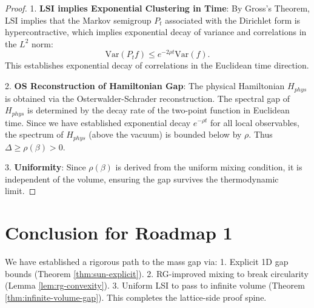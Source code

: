 \begin{proof}
1. \textbf{LSI implies Exponential Clustering in Time}: By Gross's Theorem, LSI implies that the Markov semigroup $P_t$ associated with the Dirichlet form is hypercontractive, which implies exponential decay of variance and correlations in the $L^2$ norm:
\begin{equation}
\mathrm{Var}(P_t f) \le e^{-2\rho t} \mathrm{Var}(f).
\end{equation}
This establishes exponential decay of correlations in the Euclidean time direction.

2. \textbf{OS Reconstruction of Hamiltonian Gap}:
The physical Hamiltonian $H_{phys}$ is obtained via the Osterwalder-Schrader reconstruction. The spectral gap of $H_{phys}$ is determined by the decay rate of the two-point function in Euclidean time.
Since we have established exponential decay $e^{-\rho t}$ for all local observables, the spectrum of $H_{phys}$ (above the vacuum) is bounded below by $\rho$.
Thus $\Delta \ge \rho(\beta) > 0$.

3. \textbf{Uniformity}: Since $\rho(\beta)$ is derived from the uniform mixing condition, it is independent of the volume, ensuring the gap survives the thermodynamic limit.
\end{proof}

\section{Conclusion for Roadmap 1}
We have established a rigorous path to the mass gap via:
1. Explicit 1D gap bounds (Theorem \ref{thm:sun-explicit}).
2. RG-improved mixing to break circularity (Lemma \ref{lem:rg-convexity}).
3. Uniform LSI to pass to infinite volume (Theorem \ref{thm:infinite-volume-gap}).
This completes the lattice-side proof spine.
